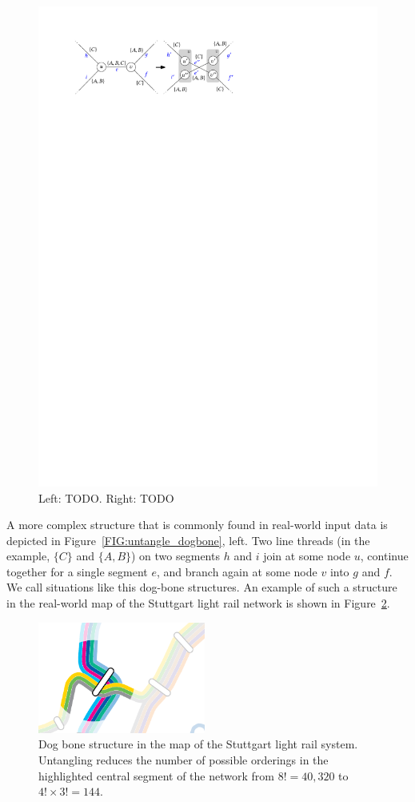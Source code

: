 \documentclass[format=acmsmall, review=false, screen=true]{acmart}
\begin{document}
\begin{figure}
\centering
  \includegraphics[width=.7\textwidth, page=2]{untangling/dogbone.pdf}
  \caption{Left: TODO. Right: TODO}  
  \label{FIG:untangle_dogbone2}
\end{figure}

A more complex structure that is commonly found in real-world input data is depicted in Figure~\ref{FIG:untangle_dogbone}, left. Two line threads (in the example, $\{C\}$ and $\{A, B\}$) on two segments $h$ and $i$ join at some node $u$, continue together for a single segment $e$, and branch again at some node $v$ into $g$ and $f$. We call situations like this dog-bone structures. An example of such a structure in the real-world map of the Stuttgart light rail network is shown in Figure~\ref{FIG:untangle_dogbone_stuttgart}.

\begin{figure}
  \centering
  \includegraphics[width=0.49\textwidth, page=1]{untangling/vvs_dogbone.pdf}
  \caption{Dog bone structure in the map of the Stuttgart light rail system. Untangling reduces the number of possible orderings in the highlighted central segment of the network from $8! = 40,320$ to $4! \times 3! = 144$. }  
  \label{FIG:untangle_dogbone_stuttgart}
\end{figure}
\end{document}
